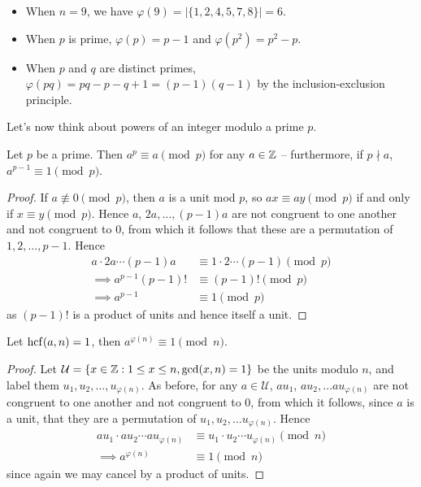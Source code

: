 \documentclass{../template/note}
\begin{document}
    \begin{example}
        \begin{itemize}
            \item When \(n = 9\), we have \(\varphi(9) = |\{1, 2, 4, 5, 7, 8\}| = 6\).
            \item When \(p\) is prime, \(\varphi(p) = p-1\) and \(\varphi(p^2) = p^2 - p\).
            \item When \(p\) and \(q\) are distinct primes, \(\varphi(pq) = pq - p - q + 1 = (p-1)(q-1)\) by the inclusion-exclusion principle.
        \end{itemize}
    \end{example}

    Let's now think about powers of an integer modulo a prime \(p\).
    
    \begin{theorem}
        Let \(p\) be a prime. Then \(a^p \equiv a \pmod p\) for any \(a \in \mathbb Z\) -- furthermore, if \(p \nmid a\), \(a^{p-1} \equiv 1 \pmod p\).
    \end{theorem}
    
    \begin{proof}
        If \(a \not\equiv 0 \pmod p\), then \(a\) is a unit mod \(p\), so \(ax \equiv ay \pmod p\) if and only if \(x \equiv y \pmod p\). Hence \(a\), \(2a, \dots, (p-1)a\) are not congruent to one another and not congruent to 0, from which it follows that these are a permutation of \(1, 2, \dots, p-1\). Hence
        \begin{align*}
            a \cdot 2a \cdots (p-1)a &\equiv 1 \cdot 2 \cdots (p-1) \pmod p \\
            \implies a^{p-1}(p-1)! &\equiv (p-1)! \pmod p \\
            \implies a^{p-1} &\equiv 1 \pmod p
        \end{align*}
        as \((p-1)!\) is a product of units and hence itself a unit.
    \end{proof}
    
    \begin{theorem}
        Let \(\operatorname{hcf}(a, n) = 1\), then \(a^{\varphi(n)} \equiv 1 \pmod n\).
        \label{fermat-euler}
    \end{theorem}
    
    \begin{proof}
        Let \(\mathcal U = \{x \in \mathbb Z: 1 \leq x \leq n, \gcd(x, n) = 1\}\) be the units modulo \(n\), and label them \(u_1, u_2, \dots, u_{\varphi(n)}\). As before, for any \(a \in \mathcal U\), \(au_1\), \(au_2, \dots au_{\varphi(n)}\) are not congruent to one another and not congruent to 0, from which it follows, since \(a\) is a unit, that they are a permutation of \(u_1, u_2, \dots u_{\varphi(n)}\). Hence
        \begin{align*}
            au_1 \cdot au_2 \cdots au_{\varphi(n)} &\equiv u_1 \cdot u_2 \cdots u_{\varphi(n)} \pmod n \\
            \implies a^{\varphi(n)} &\equiv 1 \pmod n
        \end{align*}
        since again we may cancel by a product of units.
    \end{proof}
    
\end{document}
